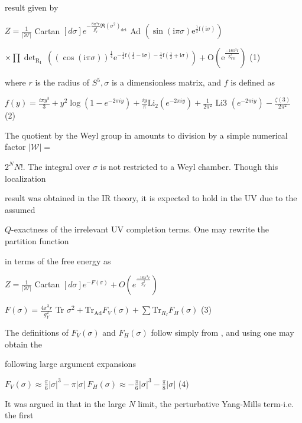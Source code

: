 \documentclass[a4paper,12pt]{article}
\begin{document}
result given by

$Z = \displaystyle \frac{1}{|\mathcal{W}|}$ Cartan $[d\sigma] e^{-\frac{8\pi^{3}r}{g_{Y}^{2}}\mathfrak{R}(\sigma^{2})_{\det}}$ Ad $(\sin(\mathrm{i}\pi\sigma)\mathrm{e}^{\frac{1}{2}\mathrm{f}(\mathrm{i}\sigma)})$
\begin{center}
$\displaystyle \times\prod\det_{\mathrm{R}_{\mathrm{I}}}\ ((\cos(\mathrm{i}\pi\sigma))^{\frac{1}{4}}\mathrm{e}^{-\frac{1}{4}\mathrm{f}(\frac{1}{2}-\mathrm{i}\sigma)-\frac{1}{4}\mathrm{f}(\frac{1}{2}+\mathrm{i}\sigma)})+\mathrm{O}(\mathrm{e}^{\frac{-16\pi^{3}\mathrm{r}}{\mathrm{g}_{\mathrm{Y}\mathrm{M}}^{2}}})$   (1)
\end{center}
where $r$ is the radius of $S^{5}, \sigma$ is a dimensionless matrix, and $f$ is defined as

$f(y)=\displaystyle \frac{i\pi y^{3}}{3}+y^{2}\log(1-e^{-2\pi iy})+\frac{iy}{\pi}\mathrm{L}\mathrm{i}_{2}(e^{-2\pi iy})+\frac{1}{2\pi^{2}}$ Li3 $(e^{-2\pi iy}) -\displaystyle \frac{\zeta(3)}{2\pi^{2}}$ (2)

The quotient by the Weyl group in amounts to division by a simple numerical factor $|\mathcal{W}| =$

$2^{N}N!$. The integral over $\sigma$ is not restricted to a Weyl chamber. Though this localization

result was obtained in the IR theory, it is expected to hold in the UV due to the assumed

$Q$-exactness of the irrelevant UV completion terms. One may rewrite the partition function

in terms of the free energy as

$Z=\displaystyle \frac{1}{|\mathcal{W}|}$ Cartan $[d\sigma]e^{-F(\sigma)}+O(e^{\frac{-16\pi^{3}r}{g_{Y}^{2}}})$
\begin{center}
$F(\displaystyle \sigma)=\frac{4\pi^{3}r}{g_{Y}^{2}}$ Tr $\displaystyle \sigma^{2}+\mathrm{T}\mathrm{r}_{\mathrm{A}\mathrm{d}}F_{V}(\sigma)+\sum \mathrm{T}\mathrm{r}_{R_{I}}F_{H}(\sigma)$   (3)
\end{center}
The definitions of $F_{V}(\sigma)$ and $F_{H}(\sigma)$ follow simply from , and using one may obtain the

following large argument expansions
\begin{center}
$F_{V}(\displaystyle \sigma)\approx\frac{\pi}{6}|\sigma|^{3}-\pi|\sigma|\ F_{H}(\sigma)\approx-\frac{\pi}{6}|\sigma|^{3}-\frac{\pi}{8}|\sigma|$   (4)
\end{center}
It was argued in that in the large $N$ limit, the perturbative Yang-Mills term-i.e. the first
\end{document}
